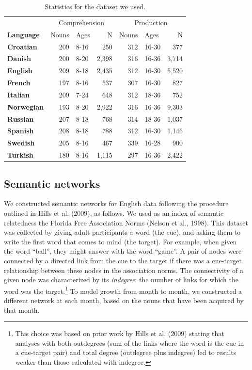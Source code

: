 \documentclass[english,floatsintext,man]{apa6}
\theoremstyle{definition}
\theoremstyle{definition}
\theoremstyle{definition}
\theoremstyle{remark}
\begin{document}
\begin{table}

\caption{\label{tab:stats}Statistics for the dataset we used.}
\centering
\begin{tabular}[t]{>{\bfseries}lrlrrlr}
\toprule
\multicolumn{1}{c}{} & \multicolumn{3}{c}{Comprehension} & \multicolumn{3}{c}{Production} \\
\cmidrule(l{2pt}r{2pt}){2-4} \cmidrule(l{2pt}r{2pt}){5-7}
Language & Nouns & Ages & N & Nouns & Ages & N\\
\midrule
Croatian & 209 & 8-16 & 250 & 312 & 16-30 & 377\\
Danish & 200 & 8-20 & 2,398 & 316 & 16-36 & 3,714\\
English & 209 & 8-18 & 2,435 & 312 & 16-30 & 5,520\\
French & 197 & 8-16 & 537 & 307 & 16-30 & 827\\
Italian & 209 & 7-24 & 648 & 312 & 18-36 & 752\\
Norwegian & 193 & 8-20 & 2,922 & 316 & 16-36 & 9,303\\
Russian & 207 & 8-18 & 768 & 314 & 18-36 & 1,037\\
Spanish & 208 & 8-18 & 788 & 312 & 16-30 & 1,146\\
Swedish & 205 & 8-16 & 467 & 339 & 16-28 & 900\\
Turkish & 180 & 8-16 & 1,115 & 297 & 16-36 & 2,422\\
\bottomrule
\end{tabular}
\end{table}

\subsection{Semantic networks}\label{semantic-networks}

We constructed semantic networks for English data following the
procedure outlined in Hills et al. (2009), as follows. We used as an
index of semantic relatedness the Florida Free Association Norms (Nelson
et al., 1998). This dataset was collected by giving adult participants a
word (the cue), and asking them to write the first word that comes to
mind (the target). For example, when given the word \enquote{ball}, they
might answer with the word \enquote{game}. A pair of nodes were
connected by a directed link from the cue to the target if there was a
cue-target relationship between these nodes in the association norms.
The connectivity of a given node was characterized by its
\emph{indegree}: the number of links for which the word was the
target.\footnote{This choice was based on prior work by Hills et al. (2009) stating that analyses with both outdegrees (sum of the links where the word is the cue in a cue-target pair) and total degree  (outdegree plus indegree) led to results weaker than those calculated with indegree.}
To model growth from month to month, we constructed a different network
at each month, based on the nouns that have been acquired by that month.
\end{document}
